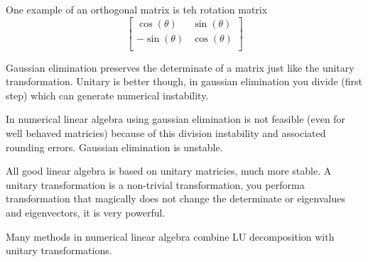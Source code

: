 \documentclass{article}
\newcommand{\be}{\begin{equation}}
\newcommand{\ee}{\end{equation}}
\begin{document}
One example of an orthogonal matrix is teh rotation matrix
\be
\begin{bmatrix}
    \cos(\theta)  & \sin(\theta) \\
    -\sin(\theta)  & \cos(\theta) \\
\end{bmatrix}
\ee



Gaussian elimination preserves the determinate of a matrix just like the unitary transformation.
Unitary is better though, in gaussian elimination you divide (first step) which can generate numerical instability.

In numerical linear algebra using gaussian elimination is not feasible (even for well behaved matricies) because of this division instability and associated rounding errors.
Gaussian elimination is unstable.

All good linear algebra is based on unitary matricies, much more stable.
A unitary transformation is a non-trivial transformation, you performa  transformation that magically does not change the determinate or eigenvalues and eigenvectors, it is very powerful.

Many methods in numerical linear algebra combine LU decomposition with unitary transformations.
\end{document}
